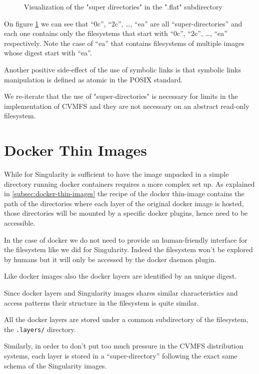 \begin{figure}
\caption{Visualization of the "super directories" in the ".flat" subdirectory}
\label{fig:super-directories}
\end{figure}

On figure \ref{fig:super-directories} we can see that “0c”, “2c”, …, “ea” are all “super-directories” and each one contains only the filesystems that start with “0c”, “2c”, …, “ea” respectively.
Note the case of “ea” that contains filesystems of multiple images whose digest start with “ea”.  

Another positive side-effect of the use of symbolic links is that symbolic links manipulation is defined as atomic in the POSIX standard.

We re-iterate that the use of "super-directories" is necessary for limits in the implementation of CVMFS and they are not necessary on an abstract read-only filesystem.

\section{Docker Thin Images}

While for Singularity is sufficient to have the image unpacked in a simple directory running docker containers requires a more complex set up.
As explained in \ref{subsec:docker-thin-images} the recipe of the docker thin-image contains the path of the directories where each layer of the original docker image is hosted, those directories will be mounted by a specific docker plugins, hence need to be accessible.

In the case of docker we do not need to provide an human-friendly interface for the filesystem like we did for Singularity. Indeed the filesystem won't be explored by humans but it will only be accessed by the docker daemon plugin.

Like docker images also the docker layers are identified by an unique digest.

Since docker layers and Singularity images shares similar characteristics and access patterns their structure in the filesystem is quite similar.

All the docker layers are stored under a common subdirectory of the filesystem, the \texttt{.layers/} directory.

Similarly, in order to don’t put too much pressure in the CVMFS distribution systems, each layer is stored in a “super-directory” following the exact same schema of the Singularity images.

